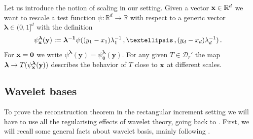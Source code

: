 \documentclass[12pt]{article}
\numberwithin{equation}{section}
\theoremstyle{plain}
\theoremstyle{definition}
\newcommand{\abs}[1]{\left\vert #1 \right\vert}
\newcommand{\R}{\ensuremath{{\mathbb R}}}
\def\bR{\mathbb{R}}\def\bS{\mathbb{S}}
\def\fy{\mathbf y}\def\fz{\mathbf z}
\def\flambda{{\boldsymbol\lambda}}
\def\fone{{\boldsymbol 1}}
\begin{document}
 Let us introduce the notion of scaling in our setting. Given a vector $\fx\in \R^d$ we want to rescale a test function $\psi\colon \R^d\to \R$  with respect to a generic vector $\flambda\in (0,1]^d$ with the definition
 \begin{equation}\label{eq:rescaled_psi}
 \psi_\fx^\flambda(\fy):= \flambda^{-\fone}\psi((y_1-x_1)\lambda_1^{- 1}\,, \ldots \,, (y_d-x_d)\lambda_d^{- 1})\,.
 \end{equation}
 For $\mathbf x= \mathbf{0}$ we write $\psi^\flambda(\fy)= \psi_{\mathbf{0}}^\flambda(\fy) $. For any given $T\in \mathcal{D}_r'$ the map $\flambda\to T(\psi_\fx^\flambda(\fy)) $
describes  the behavior of $T$ close to $\mathbf x$ at different scales.
%



%

%
%


\subsection{Wavelet bases}\label{sec:wavelet}

To prove the reconstruction theorem in the rectangular increment setting we will have to use all the regularising effects of wavelet theory, going back to \cite{debauchies}. First, we will recall some general facts about wavelet basis, mainly following \cite{Hairer2014,kern2021,meyer}.

\end{document}

